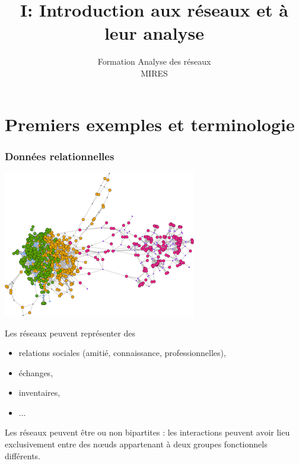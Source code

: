 \documentclass[nopagenumber,9pt]{beamer}
\title
{I: Introduction aux réseaux et à leur analyse}%
\author{}
\date{
% 
Formation Analyse des réseaux\\
MIRES }
\begin{document}
\begin{frame}
\titlepage


\end{frame}



\section{Premiers exemples et terminologie}

\begin{frame}
\frametitle{Données relationnelles}

\begin{center}
 \includegraphics[scale=.4]{plots/image_SBM.png}
\end{center}


\bigskip

Les réseaux peuvent représenter des
\begin{itemize}
\item relations sociales (amitié, connaissance, professionnelles),
\item échanges,
\item inventaires,
\item ...
\end{itemize}

\bigskip

Les réseaux peuvent \^etre ou non bipartites :  les interactions peuvent avoir lieu exclusivement entre des n\oe uds appartenant à deux groupes fonctionnels différents.



\end{frame}
\end{document}
